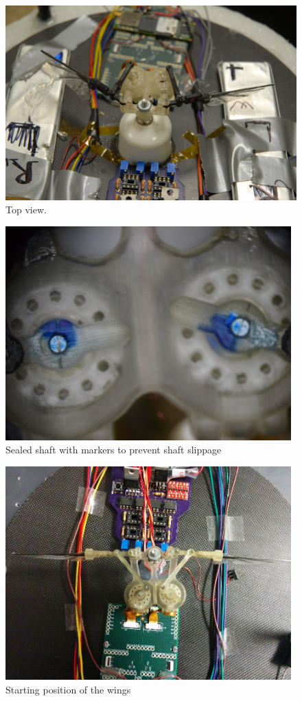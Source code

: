 \begin{appendix}
\begin{figure}
\centering
\includegraphics[width=12.5cm]{Files/Figures/photo_top.jpg}
\caption{Top view.}
\label{fig_photo_top}
\end{figure}

\begin{figure}
\centering
\includegraphics[width=11cm]{Files/Figures/sealed_shaft.jpg}	
\caption[Sealed shaft]{Sealed shaft with markers to prevent shaft slippage}
\label{fig_photo_shaft}
\end{figure}

\begin{figure}
\centering
\includegraphics[width=11cm]{Files/Figures/start_pos.jpg}
\caption{Starting position of the wings}
\label{fig_photo_start_pos}
\end{figure}



\end{appendix}
